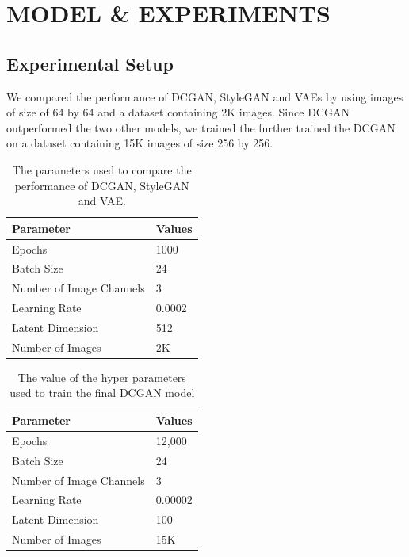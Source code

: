 \documentclass[conference]{IEEEtran}
\begin{document}
\section{MODEL \& EXPERIMENTS}

\subsection{Experimental Setup}
We compared the performance of DCGAN, StyleGAN and VAEs by using images of size of 64 by 64 and a dataset containing 2K images. Since DCGAN outperformed the two other models, we trained the further trained the DCGAN on a dataset containing 15K images of size 256 by 256.
\begin{table}[htbp]
\begin{center}
\caption{The parameters used to compare the performance of DCGAN, StyleGAN and VAE.}
\begin{tabular}{|l|l|}
\hline
Parameter                  & Values \\ \hline
Epochs                     & 1000   \\ \hline
Batch Size                 & 24     \\ \hline
Number of   Image Channels & 3      \\ \hline
Learning Rate              & 0.0002 \\ \hline
Latent   Dimension         & 512    \\ \hline
Number of   Images         & 2K     \\ \hline
\end{tabular}%
\end{center}
\label{tab:my-table}
\end{table}
\vfill\null
\begin{table}[htbp]
\begin{center}
\caption{The value of the hyper parameters used to train the final DCGAN model}
\begin{tabular}{|l|l|}
\hline
Parameter                  & Values \\ \hline
Epochs                     & 12,000   \\ \hline
Batch Size                 & 24     \\ \hline
Number of   Image Channels & 3      \\ \hline
Learning Rate              & 0.00002 \\ \hline
Latent   Dimension         & 100    \\ \hline
Number of   Images         & 15K     \\ \hline
\end{tabular}%
\end{center}
\label{tab:my-table1}
\end{table}
\end{document}
